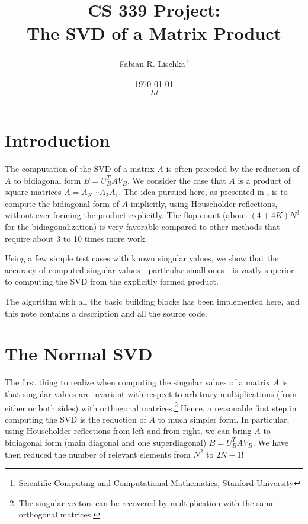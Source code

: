 \documentclass[11pt]{article}
\title{CS 339 Project:\\ The SVD of a Matrix Product}
\author{Fabian R. Lischka\thanks{Scientific Computing and Computational Mathematics, Stanford University}}
\date{\today\\\tiny{$Id$}}
\begin{document}
\lstset{language=Matlab, basicstyle=\footnotesize, numbers=left, numberstyle=\tiny, stepnumber=5, frame=single, columns=flexible, captionpos = b, breaklines=true}

\maketitle
\DeleteShortVerb{\$}
\tableofcontents


\section{Introduction}
The computation of the SVD of a matrix $A$ is often preceded by the reduction of $A$ to bidiagonal form $B = U_B^T A V_B$.  We consider the case that $A$ is a product of square matrices $A=A_K\cdots A_2 A_1$. The idea pursued here, as presented in \cite{587733}, is to compute the bidiagonal form of $A$ implicitly, using Householder reflections, without ever forming the product explicitly. The flop count (about $(4+4K)N^3$ for the bidiagonalization) is very favorable compared to other methods that require about 3 to 10 times more work. 

Using a few simple test cases with known singular values, we show that the accuracy of computed singular values---particular small ones---is vastly superior to computing the SVD from the explicitly formed product.

The algorithm with all the basic building blocks has been implemented here, and this note contains a description and all the source code.

\section{The Normal SVD}

The first thing to realize when computing the singular values of a matrix $A$ is that singular values are invariant with respect to arbitrary multiplications (from either or both sides) with orthogonal matrices.\footnote{The singular vectors can be recovered by multiplication with the same orthogonal matrices.} Hence, a reasonable first step in computing the SVD is the reduction of $A$ to much simpler form. In particular, using Householder reflections from left and from right, we can bring $A$ to bidiagonal form (main diagonal and one superdiagonal) $B = U_B^T A V_B$. We have then reduced the number of relevant elements from $N^2$ to $2N-1$! 
\end{document}
